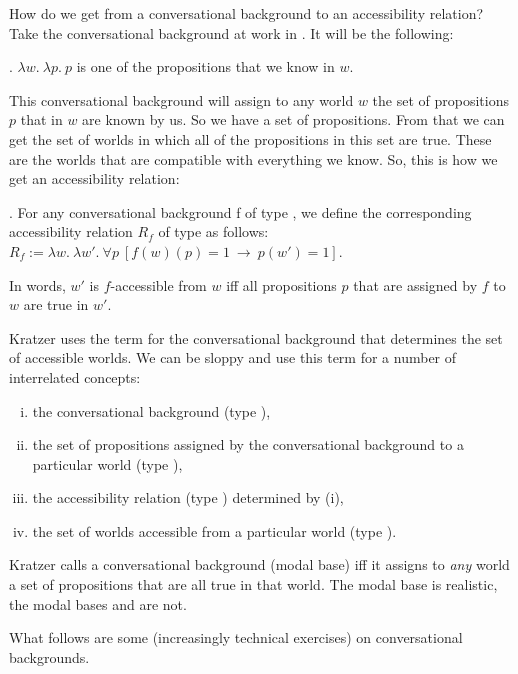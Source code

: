 How do we get from a conversational background to an accessibility relation? Take the conversational background at work in \Last. It will be the following:

\ex. $\lambda w.\ \lambda p.\ p$ is one of the propositions that we know in $w$.

This conversational background will assign to any world $w$ the set of propositions $p$ that in $w$ are known by us. So we have a set of propositions. From that we can get the set of worlds in which all of the propositions in this set are true. These are the worlds that are compatible with everything we know. So, this is how we get an accessibility relation:

\ex. \label{convers} For any conversational background f of type , we define the corresponding accessibility relation $R_{f}$ of type  as follows: \\
$R_{f} := \lambda w.\ \lambda w'.\ \forall p\ [ f(w)(p)=1\ \rightarrow\ p(w')=1 ]$.

\enlargethispage{24pt}In words, $w'$ is $f$-accessible from $w$ iff all propositions $p$ that are assigned by $f$ to $w$ are true in $w'$.

Kratzer uses the term  for the conversational background that determines the set of accessible worlds. We can be sloppy and use this term for a number of interrelated concepts:

\begin{enumerate}[(i)] 
	\item the conversational background (type ), 
	\item the set of propositions assigned by the conversational background to a particular world (type ), 
	\item the accessibility relation (type ) determined by (i), 
	\item the set of worlds accessible from a particular world (type ). 
\end{enumerate}

\noindent Kratzer calls a conversational background (modal base)  iff it assigns to \emph{any} world a set of propositions that are all true in that world. The modal base  is realistic, the modal bases  and  are not.

\medskip
\noindent What follows are some (increasingly technical exercises) on conversational backgrounds.

